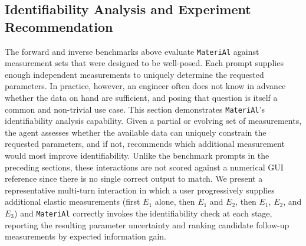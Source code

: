 \documentclass[preprint,review,10pt,number]{elsarticle}
\begin{document}
\FloatBarrier

\subsection{Identifiability Analysis and Experiment Recommendation}
\label{sec:identifiability_demo}

The forward and inverse benchmarks above evaluate \texttt{MateriAl} against measurement sets that were designed to be well-posed. 
Each prompt supplies enough independent measurements to uniquely determine the requested parameters. 
In practice, however, an engineer often does not know in advance whether the data on hand are sufficient, and posing that question is itself a common and non-trivial use case. This section demonstrates \texttt{MateriAl}'s identifiability analysis capability.
Given a partial or evolving set of measurements, the agent assesses whether the available data can uniquely constrain the requested parameters, and if not, recommends which additional measurement would most improve identifiability. 
Unlike the benchmark prompts in the preceding sections, these interactions are not scored against a numerical GUI reference since there is no single correct output to match.
We present a representative multi-turn interaction in which a user progressively supplies additional elastic measurements (first $E_1$ alone, then $E_1$ and $E_2$, then $E_1$, $E_2$, and $E_3$) and \texttt{MateriAl} correctly invokes the identifiability check at each stage, reporting the resulting parameter uncertainty and ranking candidate follow-up measurements by expected information gain.
\end{document}
